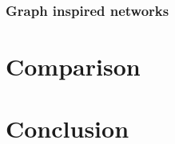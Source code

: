 \documentclass{article}
\begin{document}
\subsubsection{Graph inspired networks}


\section{Comparison}\label{sec:comparison}


\section{Conclusion}


  


\end{document}
